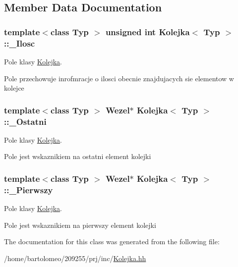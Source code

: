 \subsection{Member Data Documentation}
\hypertarget{class_kolejka_a803854da70e64a643364cac86c173dd6}{
\subsubsection[{\-\_\-\-Ilosc}]{\setlength{\rightskip}{0pt plus 5cm}template$<$class Typ $>$ unsigned int {\bf Kolejka}$<$ Typ $>$\-::\-\_\-\-Ilosc\hspace{0.3cm}{\ttfamily [private]}}}\label{class_kolejka_a803854da70e64a643364cac86c173dd6}


Pole klasy \hyperlink{class_kolejka}{Kolejka}. 

Pole przechowuje inrofmracje o ilosci obecnie znajdujacych sie elementow w kolejce \hypertarget{class_kolejka_a0a7afd58e759661de14dbf9bab1a9d03}{
\subsubsection[{\-\_\-\-Ostatni}]{\setlength{\rightskip}{0pt plus 5cm}template$<$class Typ $>$ {\bf Wezel}$\ast$ {\bf Kolejka}$<$ Typ $>$\-::\-\_\-\-Ostatni\hspace{0.3cm}{\ttfamily [private]}}}\label{class_kolejka_a0a7afd58e759661de14dbf9bab1a9d03}


Pole klasy \hyperlink{class_kolejka}{Kolejka}. 

Pole jest wskaznikiem na ostatni element kolejki \hypertarget{class_kolejka_ad033655c575e128005d38099c10cfe89}{
\subsubsection[{\-\_\-\-Pierwszy}]{\setlength{\rightskip}{0pt plus 5cm}template$<$class Typ $>$ {\bf Wezel}$\ast$ {\bf Kolejka}$<$ Typ $>$\-::\-\_\-\-Pierwszy\hspace{0.3cm}{\ttfamily [private]}}}\label{class_kolejka_ad033655c575e128005d38099c10cfe89}


Pole klasy \hyperlink{class_kolejka}{Kolejka}. 

Pole jest wskaznikiem na pierwszy element kolejki 

The documentation for this class was generated from the following file\-:\begin{DoxyCompactItemize}
\item 
/home/bartolomeo/209255/prj/inc/\hyperlink{_kolejka_8hh}{Kolejka.\-hh}\end{DoxyCompactItemize}
